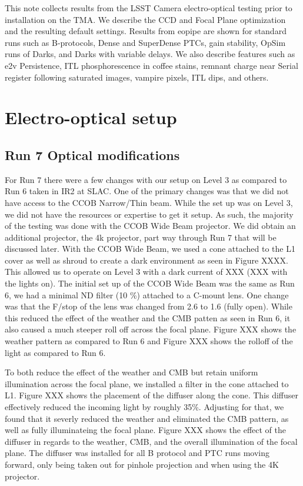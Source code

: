 
This note collects results from the LSST Camera electro-optical testing
prior to installation on the TMA. We describe the CCD and Focal Plane
optimization and the resulting default settings. Results from
eo\label{pipe}{pipe} are shown for standard runs such as
B-protocols, Dense and SuperDense PTCs, gain stability, OpSim runs of
Darks, and Darks with variable delays. We also describe features such as
e2v Persistence, ITL phosphorescence in coffee stains, remnant charge
near Serial register following saturated images, vampire pixels, ITL
dips, and others.

\section{Electro-optical setup}\label{electro-optical-setup}

\subsection{Run 7 Optical
modifications}\label{run-7-optical-modifications}

For Run 7 there were a few changes with our setup on Level 3 as compared
to Run 6 taken in IR2 at SLAC. One of the primary changes was that we
did not have access to the CCOB Narrow/Thin beam. While the set up was
on Level 3, we did not have the resources or expertise to get it setup.
As such, the majority of the testing was done with the CCOB Wide Beam
projector. We did obtain an additional projector, the 4k projector, part
way through Run 7 that will be discussed later. With the CCOB Wide Beam,
we used a cone attached to the L1 cover as well as shroud to create a
dark environment as seen in Figure XXXX. This allowed us to operate on
Level 3 with a dark current of XXX (XXX with the lights on). The initial
set up of the CCOB Wide Beam was the same as Run 6, we had a minimal ND
filter (10 \%) attached to a C-mount lens. One change was that the
F/stop of the lens was changed from 2.6 to 1.6 (fully open). While this
reduced the effect of the \textquotesingle weather\textquotesingle{} and
the \textquotesingle CMB patten\textquotesingle{} as seen in Run 6, it
also caused a much steeper roll off across the focal plane. Figure XXX
shows the weather pattern as compared to Run 6 and Figure XXX shows the
rolloff of the light as compared to Run 6.

To both reduce the effect of the
\textquotesingle weather\textquotesingle{} and
\textquotesingle CMB\textquotesingle{} but retain uniform illumination
across the focal plane, we installed a filter in the cone attached to
L1. Figure XXX shows the placement of the diffuser along the cone. This
diffuser effectively reduced the incoming light by roughly 35\%.
Adjusting for that, we found that it severly reduced the
\textquotesingle weather\textquotesingle{} and eliminated the CMB
pattern, as well as fully illuminateing the focal plane. Figure XXX
shows the effect of the diffuser in regards to the weather, CMB, and the
overall illumination of the focal plane. The diffuser was installed for
all B protocol and PTC runs moving forward, only being taken out for
pinhole projection and when using the 4K projector.

